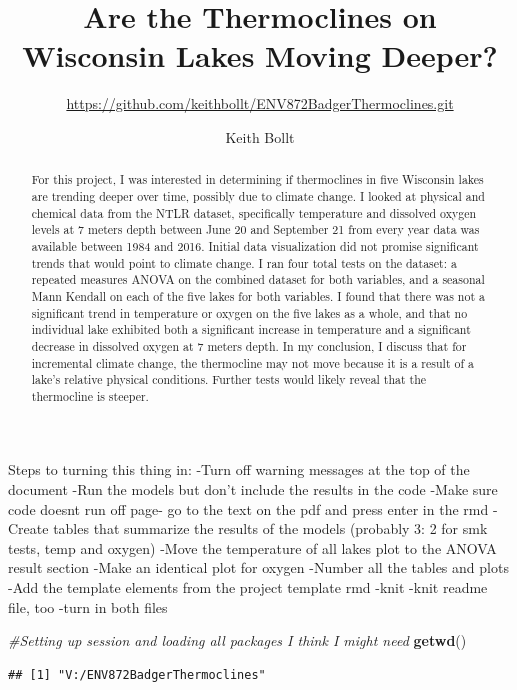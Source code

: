 \documentclass[12pt,]{article}
\title{Are the Thermoclines on Wisconsin Lakes Moving Deeper?}
\subtitle{\url{https://github.com/keithbollt/ENV872BadgerThermoclines.git}}
\author{Keith Bollt}
\date{}
\newenvironment{Shaded}{\begin{snugshade}}{\end{snugshade}}
\newcommand{\KeywordTok}[1]{\textcolor[rgb]{0.13,0.29,0.53}{\textbf{#1}}}
\newcommand{\CommentTok}[1]{\textcolor[rgb]{0.56,0.35,0.01}{\textit{#1}}}
\newcommand{\NormalTok}[1]{#1}
\begin{document}
\maketitle
\begin{abstract}
For this project, I was interested in determining if thermoclines in
five Wisconsin lakes are trending deeper over time, possibly due to
climate change. I looked at physical and chemical data from the NTLR
dataset, specifically temperature and dissolved oxygen levels at 7
meters depth between June 20 and September 21 from every year data was
available between 1984 and 2016. Initial data visualization did not
promise significant trends that would point to climate change. I ran
four total tests on the dataset: a repeated measures ANOVA on the
combined dataset for both variables, and a seasonal Mann Kendall on each
of the five lakes for both variables. I found that there was not a
significant trend in temperature or oxygen on the five lakes as a whole,
and that no individual lake exhibited both a significant increase in
temperature and a significant decrease in dissolved oxygen at 7 meters
depth. In my conclusion, I discuss that for incremental climate change,
the thermocline may not move because it is a result of a lake's relative
physical conditions. Further tests would likely reveal that the
thermocline is steeper.
\end{abstract}

Steps to turning this thing in: -Turn off warning messages at the top of
the document -Run the models but don't include the results in the code
-Make sure code doesnt run off page- go to the text on the pdf and press
enter in the rmd -Create tables that summarize the results of the models
(probably 3: 2 for smk tests, temp and oxygen) -Move the temperature of
all lakes plot to the ANOVA result section -Make an identical plot for
oxygen -Number all the tables and plots -Add the template elements from
the project template rmd -knit -knit readme file, too -turn in both
files

\begin{Shaded}
\begin{Highlighting}[]
\CommentTok{#Setting up session and loading all packages I think I might need}
\KeywordTok{getwd}\NormalTok{()}
\end{Highlighting}
\end{Shaded}

\begin{verbatim}
## [1] "V:/ENV872BadgerThermoclines"
\end{verbatim}
\end{document}
